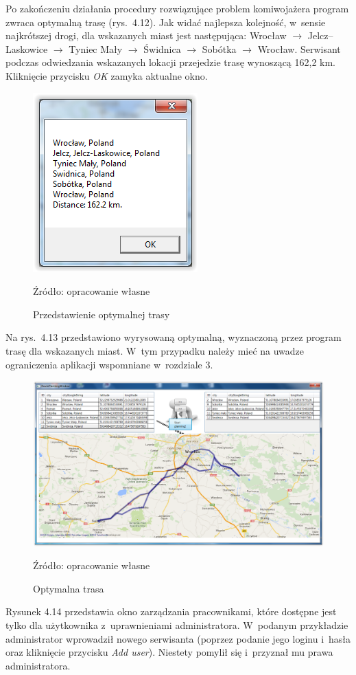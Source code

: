 \documentclass[12pt,a4paper]{report}
\begin{document}
Po zakończeniu działania procedury rozwiązujące problem komiwojażera program zwraca optymalną trasę (rys.~4.12). Jak widać najlepsza kolejność, w~sensie najkrótszej drogi, dla wskazanych miast jest następująca: Wrocław $\rightarrow$ Jelcz--Laskowice $\rightarrow$ Tyniec Mały $\rightarrow$ Świdnica $\rightarrow$ Sobótka $\rightarrow$ Wrocław. Serwisant podczas odwiedzania wskazanych lokacji przejedzie trasę wynoszącą 162,2 km. Kliknięcie przycisku \textit{OK} zamyka aktualne okno.

\begin{figure}[!bht]
\centering
\includegraphics[scale=1]{Pictures/OptimalRoute.png}
\label{fig: OptimalRoute}
\caption{Przedstawienie optymalnej trasy}{Źródło: opracowanie własne}
\end{figure}
\newpage
Na rys.~4.13 przedstawiono wyrysowaną optymalną, wyznaczoną przez program trasę dla wskazanych miast. W~tym przypadku należy mieć na uwadze ograniczenia aplikacji wspomniane w~rozdziale 3. 

\begin{figure}[!bht]
\centering
\includegraphics[scale=0.35]{Pictures/DrawedRoute.png}
\label{fig: DrawedRoute}
\caption{Optymalna trasa}{Źródło: opracowanie własne}
\end{figure}
\newpage
Rysunek 4.14 przedstawia okno zarządzania pracownikami, które dostępne jest tylko dla użytkownika z~uprawnieniami administratora. W~podanym przykładzie administrator wprowadził nowego serwisanta (poprzez podanie jego loginu i~hasła oraz kliknięcie przycisku \textit{Add user}). Niestety pomylił się i~przyznał mu prawa administratora.
\end{document}
